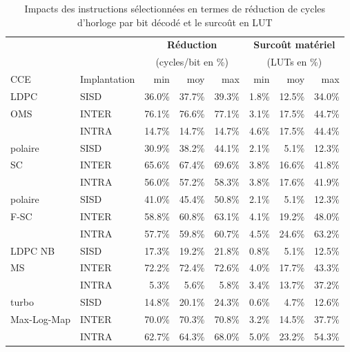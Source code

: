 \documentclass[../main.tex]{subfiles}
\begin{document}
\begin{table}[!tb]
    \footnotesize
    \centering
    \begin{tabular}{ll rrr rrr}
        \toprule
             &              &  \multicolumn{3}{c}{\textbf{Réduction}} & \multicolumn{3}{c}{\textbf{Surcoût matériel}} \\ 
             &              &  \multicolumn{3}{c}{(cycles/bit en \%)} & \multicolumn{3}{c}{(LUTs en \%)} \\ 
        CCE & Implantation & min & moy & max                 & min & moy & max \\ 
        \cmidrule(l){2-8}
        LDPC & SISD         & 36.0\% & 37.7\% & 39.3\%               & 1.8\% & 12.5\% & 34.0\% \\ 
        OMS & INTER         & 76.1\% & 76.6\% & 77.1\%               & 3.1\% & 17.5\% & 44.7\% \\ 
        ~ & INTRA           & 14.7\% & 14.7\% & 14.7\%               & 4.6\% & 17.5\% & 44.4\% \\ 
        \cmidrule(l){2-8}

        polaire & SISD      & 30.9\% & 38.2\% & 44.1\%               & 2.1\% & 5.1\%  & 12.3\% \\ 
        SC & INTER          & 65.6\% & 67.4\% & 69.6\%               & 3.8\% & 16.6\% & 41.8\% \\ 
        ~ & INTRA           & 56.0\% & 57.2\% & 58.3\%               & 3.8\% & 17.6\% & 41.9\% \\ 
        \cmidrule(l){2-8}

        polaire & SISD      & 41.0\% & 45.4\% & 50.8\%               & 2.1\% & 5.1\%  & 12.3\% \\ 
        F-SC & INTER        & 58.8\% & 60.8\% & 63.1\%               & 4.1\% & 19.2\% & 48.0\% \\ 
        ~ & INTRA           & 57.7\% & 59.8\% & 60.7\%               & 4.5\% & 24.6\% & 63.2\% \\ 
        \cmidrule(l){2-8}

        LDPC NB & SISD      & 17.3\% & 19.2\% & 21.8\%               & 0.8\% & 5.1\%  & 12.5\% \\ 
        MS & INTER          & 72.2\% & 72.4\% & 72.6\%               & 4.0\% & 17.7\% & 43.3\% \\ 
        ~ & INTRA           & 5.3\%  & 5.6\% & 5.8\%                 & 3.4\% & 13.7\% & 37.2\% \\ 
        \cmidrule(l){2-8}
        
        turbo & SISD        & 14.8\% & 20.1\% & 24.3\%               & 0.6\% & 4.7\%  & 12.6\% \\ 
        Max-Log-Map& INTER  & 70.0\% & 70.3\% & 70.8\%               & 3.2\% & 14.5\% & 37.7\% \\ 
        ~ & INTRA           & 62.7\% & 64.3\% & 68.0\%               & 5.0\% & 23.2\% & 54.3\% \\ 
    \bottomrule
    \end{tabular}
    \caption{Impacts des instructions sélectionnées en termes de réduction de cycles d'horloge par bit décodé et le surcoût en LUT}
    \label{tab:hw}
\end{table}
\end{document}
